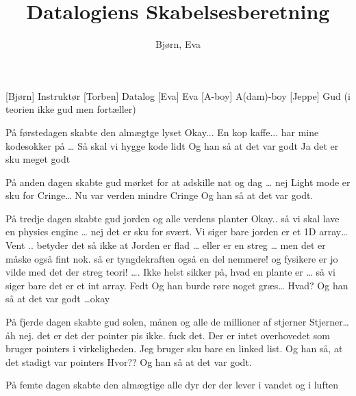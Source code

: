 \documentclass[a4paper,11pt]{article}
\title{Datalogiens Skabelsesberetning}
\author{Bjørn, Eva}
\begin{document}
\maketitle

\begin{roles}
[Bjørn] Instruktør
[Torben] Datalog
[Eva] Eva
[A-boy] A(dam)-boy
[Jeppe] Gud (i teorien ikke gud men fortæller)
\end{roles}

\begin{props}
\end{props}


\begin{sketch}

 På førstedagen skabte den almægtge lyset
 Okay... En kop kaffe... har mine kodesokker på … Så skal vi hygge kode lidt 
Og han så at det var godt
Ja det er sku meget godt

På anden dagen skabte gud mørket for at adskille nat og dag
… nej  Light mode er sku for Cringe…
 Nu var verden mindre Cringe
Og han så at det var godt.

 På tredje dagen skabte gud jorden og alle verdens planter
 Okay.. så vi skal lave en physics engine … nej det er sku for svært. Vi siger bare jorden er et 1D array… Vent ..  betyder det så ikke at Jorden er flad … eller er en streg … men det er måske også fint nok.  så er tyngdekraften også en del nemmere! og fysikere er jo vilde med det der streg teori!
….
Ikke helst sikker på, hvad en plante er … så vi siger bare det er et int array. 
Fedt
 Og han  burde røre noget græs… 
 Hvad?
 Og han så at det var godt 
 …okay

 På fjerde dagen skabte gud solen, månen og alle de millioner af stjerner
 Stjerner… åh nej. det er det der pointer pis ikke. fuck det. Der er intet overhovedet som bruger pointers i virkeligheden. Jeg bruger sku bare en linked list.  
 Og han så, at det stadigt var pointers
 Hvor??
 Og han så at det var godt. 

 På femte dagen skabte den almægtige alle dyr der der lever i vandet og i luften 


\end{sketch}
\end{document}
